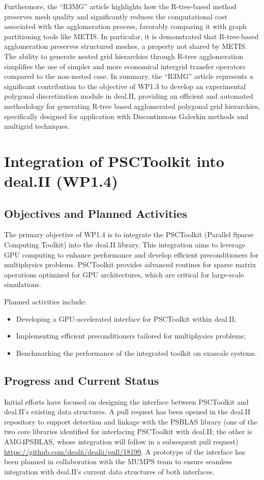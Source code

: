 \documentclass[a4paper,12pt]{article}
\begin{document}
Furthermore, the ``R3MG'' article highlights how the R-tree-based method preserves
mesh quality and significantly reduces the computational cost associated with
the agglomeration process, favorably comparing it with graph partitioning tools
like METIS. In particular, it is demonstrated that R-tree-based agglomeration
preserves structured meshes, a property not shared by METIS. The ability to
generate nested grid hierarchies through R-tree agglomeration simplifies the use
of simpler and more economical intergrid transfer operators compared to the
non-nested case. In summary, the ``R3MG'' article represents a significant
contribution to the objective of WP1.3 to develop an experimental polygonal
discretization module in deal.II, providing an efficient and automated
methodology for generating R-tree based agglomerated polygonal grid hierarchies,
specifically designed for application with Discontinuous Galerkin methods and
multigrid techniques.

\section{Integration of PSCToolkit into deal.II (WP1.4)}
    \subsection{Objectives and Planned Activities}
        The primary objective of WP1.4 is to integrate the PSCToolkit (Parallel Sparse Computing Toolkit) into the deal.II library. This integration aims to leverage GPU computing to enhance performance and develop efficient preconditioners for multiphysics problems. PSCToolkit provides advanced routines for sparse matrix operations optimized for GPU architectures, which are critical for large-scale simulations.

        Planned activities include:
        \begin{itemize}
            \item Developing a GPU-accelerated interface for PSCToolkit within deal.II;
            \item Implementing efficient preconditioners tailored for multiphysics problems;
            \item Benchmarking the performance of the integrated toolkit on exascale systems.
        \end{itemize}

        \subsection{Progress and Current Status}
        Initial efforts have focused on designing the interface between PSCToolkit and deal.II's existing data structures. A pull request has been opened in the deal.II repository to support detection and linkage with the PSBLAS library (one of the two core libraries identified for interfacing PSCToolkit with deal.II; the other is AMG4PSBLAS, whose integration will follow in a subsequent pull request) \url{https://github.com/dealii/dealii/pull/18199}. A prototype of the interface has been planned in collaboration with the MUMPS team to ensure seamless integration with deal.II's current data structures of both interfaces.
\end{document}
